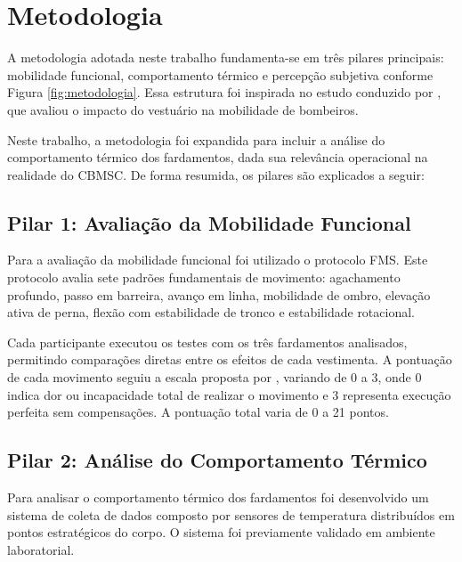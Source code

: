\chapter{Metodologia}
\label{cap:metodologia}

A metodologia adotada neste trabalho fundamenta-se em três pilares principais: mobilidade funcional, 
comportamento térmico e percepção subjetiva conforme Figura \ref{fig:metodologia}. Essa estrutura foi inspirada no estudo conduzido por 
\textcite{orr2019impact}, que avaliou o impacto do vestuário na mobilidade de bombeiros. 


Neste trabalho, a metodologia foi expandida para incluir a análise do comportamento térmico dos 
fardamentos, dada sua relevância operacional na realidade do CBMSC. De forma resumida, os pilares 
são explicados a seguir:

\section{Pilar 1: Avaliação da Mobilidade Funcional}

Para a avaliação da mobilidade funcional foi utilizado o protocolo \acrfull{FMS}. 
Este protocolo avalia sete padrões fundamentais de movimento: agachamento profundo, passo em barreira, 
avanço em linha, mobilidade de ombro, elevação ativa de perna, flexão com estabilidade de tronco e 
estabilidade rotacional.

Cada participante executou os testes com os três fardamentos analisados, permitindo comparações 
diretas entre os efeitos de cada vestimenta. A pontuação de cada movimento seguiu a escala proposta 
por \textcite{cook2006pre}, variando de 0 a 3, onde 0 indica dor ou incapacidade total de realizar o 
movimento e 3 representa execução perfeita sem compensações. A pontuação total varia de 0 a 21 pontos.

\section{Pilar 2: Análise do Comportamento Térmico}

Para analisar o comportamento térmico dos fardamentos foi desenvolvido um sistema de coleta de dados 
composto por sensores de temperatura distribuídos em pontos estratégicos do corpo. O sistema foi 
previamente validado em ambiente laboratorial.

